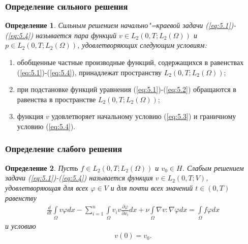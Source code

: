 \documentclass[10pt, pdf, hyperref={unicode}]{beamer}
\newtheorem{ru_def}{Определение}
\renewenvironment{definition}{\begin{ru_def}}{\end{ru_def}}
\begin{document}
  \begin{frame}
    \frametitle{Определение сильного решения}
    \begin{center}
      \begin{minipage}[h]{0.97\linewidth}
        \begin{definition}
          Сильным решением начально"=краевой задачи (\ref{eq:5.1})-(\ref{eq:5.4})
          называется пара функций $v\in L_2(0, T; L_2(\Omega))$ и
          $p\in L_2(0, T; L_2(\Omega))$, удовлетворяющих следующим условиям:
        \end{definition}
        \begin{enumerate} 
          \item обобщенные частные производные функций, содержащихся в равенствах
          (\ref{eq:5.1})-(\ref{eq:5.4}), принадлежат пространству $L_2(0, T; L_2(\Omega))$;
          \item при подстановке функций уравнения (\ref{eq:5.1})-(\ref{eq:5.2})
          обращаются в равенства в пространстве $L_2(0, T; L_2(\Omega))$;
          \item функция $v$ удовлетворяет начальному условию (\ref{eq:5.3}) и граничному условию (\ref{eq:5.4}).
        \end{enumerate}
      \end{minipage}
    \end{center}
  \end{frame}


  \begin{frame}
    \frametitle{Определение слабого решения}
    \begin{center}
      \begin{minipage}[h]{0.97\linewidth}
\begin{definition}
    Пусть $f\in L_2(0,T;L_2(\Omega))$ и $v_0\in H$. Слабым решением задачи (\ref{eq:5.1})-(\ref{eq:5.4}) называется функция $v\in L_2(0, T;V)$,
    удовлетворяющая для всех $\varphi \in V$ и для почти всех значений $t \in (0, T)$ равенству
    \begin{equation}\label{eq:5.6}
        \begin{gathered}
            \frac{d}{dt}\int\limits_\Omega v \varphi dx-\sum_{i=1}^{n}\int\limits_\Omega v_i v
            \frac{\partial \varphi }{\partial x_i}dx + \nu\int\limits_\Omega \nabla v :\nabla\varphi dx=
            \int\limits_\Omega f \varphi dx
        \end{gathered}
    \end{equation}
    и условию
    \begin{equation}\label{eq:5.7}
        \begin{gathered}
            v(0) = v_0.
        \end{gathered}
    \end{equation}
\end{definition}
      \end{minipage}
    \end{center}
  \end{frame}
\end{document}
